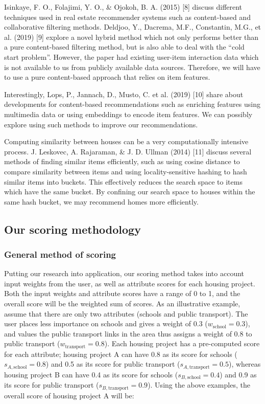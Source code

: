 \documentclass[a4paper, 11pt]{article}
\begin{document}
    Isinkaye, F. O., Folajimi, Y. O., \& Ojokoh, B. A. (2015) [8] discuss different techniques used in real estate recommender systems such as content-based and collaborative filtering methods. Deldjoo, Y., Dacrema, M.F., Constantin, M.G., et al. (2019) [9] explore a novel hybrid method which not only performs better than a pure content-based filtering method, but is also able to deal with the “cold start problem”. However, the paper had existing user-item interaction data which is not available to us from publicly available data sources. Therefore, we will have to use a pure content-based approach that relies on item features. 
    
    Interestingly, Lops, P., Jannach, D., Musto, C. et al. (2019) [10] share about developments for content-based recommendations such as enriching features using multimedia data or using embeddings to encode item features. We can possibly explore using such methods to improve our recommendations. 
    
    Computing similarity between houses can be a very computationally intensive process. J. Leskovec, A. Rajaraman, \& J. D. Ullman (2014) [11] discuss several methods of finding similar items efficiently, such as using cosine distance to compare similarity between items and using locality-sensitive hashing to hash similar items into buckets. This effectively reduces the search space to items which have the same bucket. By confining our search space to houses within the same hash bucket, we may recommend homes more efficiently. 

    \subsection{Our scoring methodology}
    
\subsubsection{General method of scoring}    
    
    Putting our research into application, our scoring method takes into account input weights from the user, as well as attribute scores for each housing project. Both the input weights and attribute scores have a range of 0 to 1, and the overall score will be the weighted sum of scores. As an illustrative example, assume that there are only two attributes (schools and public transport). The user places less importance on schools and gives a weight of  0.3 ($w_{\text{school}}  = 0.3$), and values the public transport links in the area thus assigns a weight of 0.8 to public transport ($w_{\text{transport}}  = 0.8$). Each housing project has a pre-computed score for each attribute; housing project A can have 0.8 as its score for schools ($s_{A,\text{school}} = 0.8$) and 0.5 as its score for public transport ($s_{A,\text{transport}} = 0.5$), whereas housing project B can have 0.4 as its score for schools ($s_{B,\text{school}} = 0.4$) and 0.9 as its score for public transport ($s_{B,\text{transport}} = 0.9$). Using the above examples, the overall score of housing project A will be:
    
\end{document}
